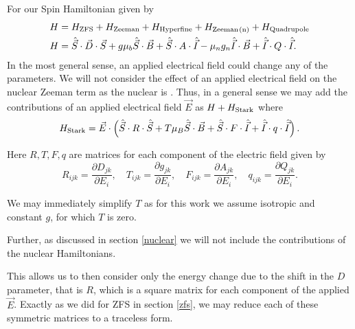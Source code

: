 \section{}\label{stark}
For our Spin Hamiltonian given by 
\begin{equation}
    \begin{align}
        H &= H_{\ce{ZFS}} + H_{\ce{Zeeman}} + H_{\ce{Hyperfine}} + H_{\ce{Zeeman(n)}}+ H_{\ce{Quadrupole}}\\ 
        H &= \hat{\vec{S}}\cdot{\vec{D}}\cdot{\vec{S}} + g\mu_b \hat{\vec{S}}\cdot \vec{B}  + \hat{\vec{S}}\cdot A \cdot \hat{\vec{I}}  -  \mu_n g_n \hat{\vec{I}}\cdot\vec{B} + \hat{\vec{I}} \cdot Q \cdot \hat{\vec{I}}.
    \end{align}
\end{equation}
In the most general sense, an applied electrical field could change any of the parameters. We will not consider the effect of an applied electrical field on the nuclear Zeeman term as the nuclear is  \cite{mims}. 
Thus, in a general sense we may add the contributions of an applied electrical field $\vec{E}$ as $H + H_{\ce{Stark}}$ where 
\begin{equation}
    H_{\ce{Stark}} = \vec{E}\cdot\left(\hat{\vec{S}}\cdot R \cdot \hat{\vec{S}} + T \mu_B \hat{\vec{S}}\cdot \vec{B} + \hat{\vec{S}}\cdot F \cdot \hat{\vec{I}} + \hat{\vec{I}} \cdot q \cdot \hat{\vec{I}} \right). 
    \label{eq:}
\end{equation}%

Here $R, T, F, q$ are matrices for each component of the electric field given by 
\begin{equation}
    R_{ijk} = \frac{\partial D_{jk}}{\partial E_i}, \quad 
    T_{ijk} = \frac{\partial g_{jk}}{\partial E_i}, \quad 
    F_{ijk} = \frac{\partial A_{jk}}{\partial E_i}, \quad 
    q_{ijk} = \frac{\partial Q_{jk}}{\partial E_i}.
    \label{eq:}
\end{equation}

We may immediately simplify $T$ as for this work we assume isotropic and constant $g$, for which $T$ is zero.  

Further, as discussed in section \ref{nuclear} we will not include the contributions of the nuclear Hamiltonians. 

This allows us to then consider only the energy change due to the shift in the $D$ parameter, that is $R$, which is a square matrix for each component of the applied $\vec{E}$. 
Exactly as we did for ZFS in section \ref{zfs}, we may reduce each of these symmetric matrices to a traceless form. 

